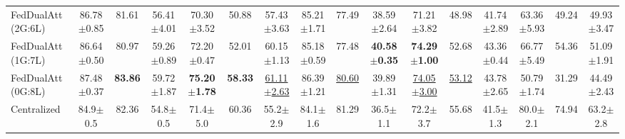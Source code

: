 \documentclass[a4paper]{article}
\begin{document}
\begin{table}[htbp]
\begin{adjustbox}{max width=\linewidth}
\begin{tabular}{l|ccc|ccc|ccc|ccc|ccc}
    FedDualAtt (2G:6L) & 86.78$\pm$0.85 & 81.61 & 56.41$\pm$4.01 & 70.30$\pm$3.52 & 50.88 & 57.43$\pm$3.63 & 85.21$\pm$1.71 & 77.49 & 38.59$\pm$2.64 & 71.21$\pm$3.82 & 48.98 & 41.74$\pm$2.89 & 63.36$\pm$5.93 & 49.24 & 49.93$\pm$3.47 \\
    FedDualAtt (1G:7L) & 86.64$\pm$0.50 & 80.97 & 59.26$\pm$0.89 & 72.20$\pm$0.47 & 52.01 & 60.15$\pm$1.13 & 85.18$\pm$0.59 & 77.48 & \textbf{40.58$\pm$0.35} & \textbf{74.29$\pm$1.00} & 52.68 & 43.36$\pm$0.44 & 66.77$\pm$5.49 & 54.36 & 51.09$\pm$1.91 \\
    FedDualAtt (0G:8L) & 87.48$\pm$0.37 & \textbf{83.86} & 59.72$\pm$1.87 & \textbf{75.20$\pm$1.78} & \textbf{58.33} & \underline{61.11$\pm$2.63} & 86.39$\pm$1.21 & \underline{80.60} & 39.89$\pm$1.31 & \underline{74.05$\pm$3.00} & \underline{53.12} & 43.78$\pm$2.65 & 50.79$\pm$1.74 & 31.29 & 44.49$\pm$2.43 \\
    \midrule
    Centralized & 84.9$\pm$0.5 & 82.36 & 54.8$\pm$0.5 & 71.4$\pm$5.0 & 60.36 & 55.2$\pm$2.9 & 84.1$\pm$1.6 & 81.29 & 36.5$\pm$1.1 & 72.2$\pm$3.7 & 55.68 & 41.5$\pm$1.3 & 80.0$\pm$2.1 & 74.94 & 63.2$\pm$2.8 \\
    \bottomrule
  \end{tabular}
  \end{adjustbox}
\end{table}
\end{document}
